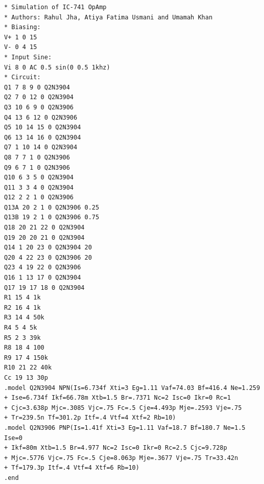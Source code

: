 \documentclass[11pt]{article}
\begin{document}
\begin{verbatim}
* Simulation of IC-741 OpAmp
* Authors: Rahul Jha, Atiya Fatima Usmani and Umamah Khan
* Biasing:
V+ 1 0 15
V- 0 4 15
* Input Sine:
Vi 8 0 AC 0.5 sin(0 0.5 1khz)
* Circuit:
Q1 7 8 9 0 Q2N3904
Q2 7 0 12 0 Q2N3904
Q3 10 6 9 0 Q2N3906
Q4 13 6 12 0 Q2N3906
Q5 10 14 15 0 Q2N3904
Q6 13 14 16 0 Q2N3904
Q7 1 10 14 0 Q2N3904
Q8 7 7 1 0 Q2N3906
Q9 6 7 1 0 Q2N3906
Q10 6 3 5 0 Q2N3904
Q11 3 3 4 0 Q2N3904
Q12 2 2 1 0 Q2N3906
Q13A 20 2 1 0 Q2N3906 0.25
Q13B 19 2 1 0 Q2N3906 0.75
Q18 20 21 22 0 Q2N3904
Q19 20 20 21 0 Q2N3904
Q14 1 20 23 0 Q2N3904 20
Q20 4 22 23 0 Q2N3906 20
Q23 4 19 22 0 Q2N3906
Q16 1 13 17 0 Q2N3904
Q17 19 17 18 0 Q2N3904
R1 15 4 1k
R2 16 4 1k
R3 14 4 50k
R4 5 4 5k
R5 2 3 39k
R8 18 4 100
R9 17 4 150k
R10 21 22 40k
Cc 19 13 30p
.model Q2N3904 NPN(Is=6.734f Xti=3 Eg=1.11 Vaf=74.03 Bf=416.4 Ne=1.259
+ Ise=6.734f Ikf=66.78m Xtb=1.5 Br=.7371 Nc=2 Isc=0 Ikr=0 Rc=1
+ Cjc=3.638p Mjc=.3085 Vjc=.75 Fc=.5 Cje=4.493p Mje=.2593 Vje=.75
+ Tr=239.5n Tf=301.2p Itf=.4 Vtf=4 Xtf=2 Rb=10)
.model Q2N3906 PNP(Is=1.41f Xti=3 Eg=1.11 Vaf=18.7 Bf=180.7 Ne=1.5 Ise=0
+ Ikf=80m Xtb=1.5 Br=4.977 Nc=2 Isc=0 Ikr=0 Rc=2.5 Cjc=9.728p
+ Mjc=.5776 Vjc=.75 Fc=.5 Cje=8.063p Mje=.3677 Vje=.75 Tr=33.42n
+ Tf=179.3p Itf=.4 Vtf=4 Xtf=6 Rb=10)
.end
\end{verbatim}
\end{document}
